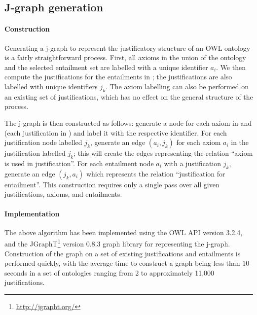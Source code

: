 \subsection{J-graph generation}

\paragraph{Construction}

Generating a j-graph to represent the justificatory structure of an OWL ontology is a fairly straightforward process. First, all axioms in the union of the ontology and the selected entailment set \entset are labelled with a unique identifier $a_{i}$. We then compute the justifications for the entailments in \entset; the justifications are also labelled with unique identifiers $j_{k}$. The axiom labelling can also be performed on an existing set of justifications, which has no effect on the general structure of the process.

The j-graph is then constructed as follows: generate a node for each axiom in \justax and \entset (each justification in \justs) and label it with the respective identifier. For each justification node labelled $j_{k}$, generate an edge $(a_{i}, j_{k})$ for each axiom $a_{i}$ in the justification labelled $j_{k}$; this will create the edges representing the relation \enquote{axiom is used in justification}. For each entailment node $a_{i}$ with a justification $j_{k}$, generate an edge $(j_{k}, a_{i})$ which represents the relation \enquote{justification for entailment}. This construction requires only a single pass over all given justifications, axioms, and entailments.

	
\paragraph{Implementation}
\label{sec:jstrucimpl}
The above algorithm has been implemented using the OWL API version 3.2.4, and the JGraphT\footnote{\url{http://jgrapht.org/}} version 0.8.3 graph library for representing the j-graph. Construction of the graph on a set of existing justifications and entailments is performed quickly, with the average time to construct a graph being less than 10 seconds in a set of ontologies ranging from 2 to approximately 11,000 justifications.



